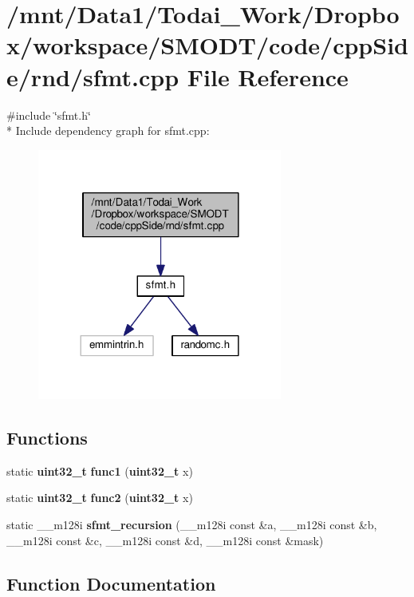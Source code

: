 \section{/mnt/\-Data1/\-Todai\-\_\-\-Work/\-Dropbox/workspace/\-S\-M\-O\-D\-T/code/cpp\-Side/rnd/sfmt.cpp File Reference}
\label{rnd_2sfmt_8cpp}
{\ttfamily \#include \char`\"{}sfmt.\-h\char`\"{}}\\*
Include dependency graph for sfmt.\-cpp\-:\nopagebreak
\begin{figure}[H]
\begin{center}
\leavevmode
\includegraphics[width=228pt]{rnd_2sfmt_8cpp__incl}
\end{center}
\end{figure}
\subsection*{Functions}
\begin{DoxyCompactItemize}
\item 
static {\bf uint32\-\_\-t} {\bf func1} ({\bf uint32\-\_\-t} x)
\item 
static {\bf uint32\-\_\-t} {\bf func2} ({\bf uint32\-\_\-t} x)
\item 
static \-\_\-\-\_\-m128i {\bf sfmt\-\_\-recursion} (\-\_\-\-\_\-m128i const \&a, \-\_\-\-\_\-m128i const \&b, \-\_\-\-\_\-m128i const \&c, \-\_\-\-\_\-m128i const \&d, \-\_\-\-\_\-m128i const \&mask)
\end{DoxyCompactItemize}


\subsection{Function Documentation}
